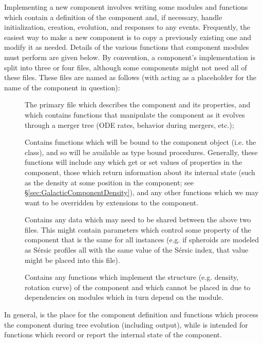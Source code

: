 Implementing a new component involves writing some modules and functions which contain a definition of the component and, if necessary, handle initialization, creation, evolution, and responses to any events. Frequently, the easiest way to make a new component is to copy a previously existing one and modify it as needed. Details of the various functions that component modules must perform are given below.
By convention, a component's implementation is split into three or four files, although some components might not need all of these files. These files are named as follows (with  acting as a placeholder for the name of the component in question):
\begin{description}
 \item [] The primary file which describes the component and its properties, and which contains functions that manipulate the component as it evolves through a merger tree (ODE rates, behavior during mergers, etc.);
 \item [] Contains functions which will be bound to the component object (i.e. the  class), and so will be available as type bound procedures. Generally, these functions will include any which get or set values of properties in the component, those which return information about its internal state (such as the density at some position in the component; see \S\ref{sec:GalacticComponentDensity}), and any other functions which we may want to be overridden by extensions to the component.
 \item [] Contains any data which may need to be shared between the above two files. This might contain parameters which control some property of the component that is the same for all instances (e.g. if spheroids are modeled as S\'ersic profiles all with the same value of the S\'ersic index, that value might be placed into this file).
 \item [] Contains any functions which implement the structure (e.g. density, rotation curve) of the component and which cannot be placed in  due to dependencies on modules which in turn depend on the  module.
\end{description}
In general,  is the place for the component definition and functions which process the component during tree evolution (including output), while  is intended for functions which record or report the internal state of the component.

